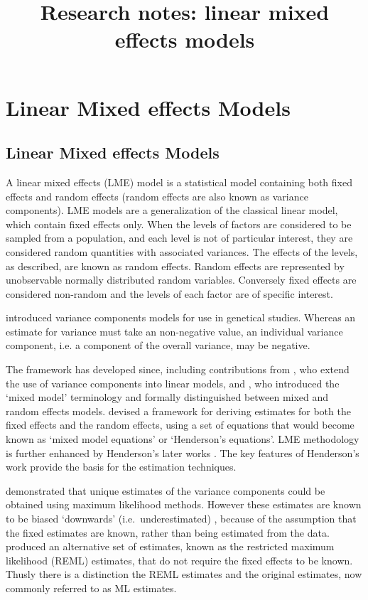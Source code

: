 \documentclass[12pt, a4paper]{report}
\title{Research notes: linear mixed effects models}
\author{ } \date{ }
\theoremstyle{plain}
\theoremstyle{definition}
\theoremstyle{remark}
\begin{document}
	\tableofcontents
	
	\chapter{Linear Mixed effects Models}
	
	
	\section{Linear Mixed effects Models}
	A linear mixed effects (LME) model is a statistical model containing both fixed effects and random effects (random effects are also known as variance components). LME models are a generalization of the classical linear model, which contain fixed effects only. When the levels of factors are considered to be sampled from a population, and each level is not of particular interest, they are considered random quantities with associated variances. The effects of the levels, as described, are known as random effects. Random effects are represented by unobservable normally distributed random variables. Conversely fixed effects are considered non-random and the levels of each factor are of specific interest.
	
	\citet{Fisher4} introduced variance components models for use in genetical studies. Whereas an estimate for variance must take an non-negative value, an individual variance component, i.e. a component of the overall variance, may be negative.
	
	
	The framework has developed since, including contributions from
	\citet{tippett}, who extend the use of variance components into linear models, and \citet{eisenhart}, who introduced the `mixed model' terminology and formally distinguished between mixed and random effects models. \citet{Henderson:1950} devised a framework for deriving estimates for both the fixed effects and the random effects, using a set of equations that would become known as `mixed model equations' or `Henderson's equations'.
	LME methodology is further enhanced by Henderson's later works \citep{Henderson53, Henderson59,Henderson63,Henderson73,Henderson84a}. The key features of Henderson's work provide the basis for the estimation techniques.
	
	\citet{HartleyRao} demonstrated that unique estimates of the variance components could be obtained using maximum likelihood methods. However these estimates are known to be biased `downwards' (i.e.\ underestimated) , because of the assumption that the fixed estimates are known, rather than being estimated from the data. \citet{PattersonThompson} produced an alternative set of estimates, known as the restricted maximum likelihood (REML) estimates, that do not require the fixed effects to be known. Thusly there is a distinction the REML estimates and the original estimates, now commonly referred to as ML estimates.
	
\end{document}
